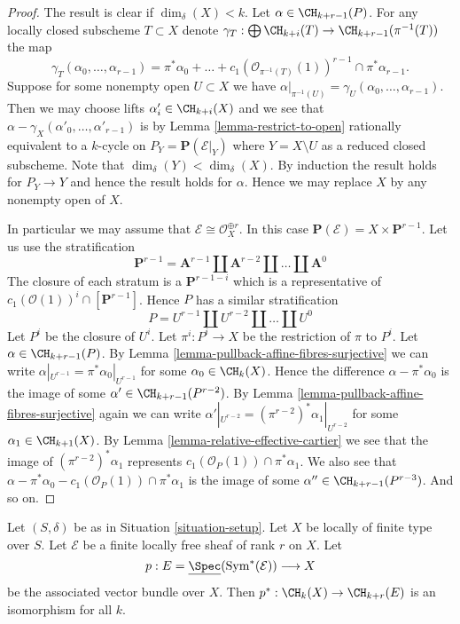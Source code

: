 \begin{proof}
\medskip\noindent
The result is clear if $\dim_\delta(X) < k$.
Let $\alpha \in \CH_{k + r - 1}(P)$.
For any locally closed subscheme $T \subset X$ denote
$\gamma_T : \bigoplus \CH_{k + i}(T) \to \CH_{k + r - 1}(\pi^{-1}(T))$
the map
$$
\gamma_T(\alpha_0, \ldots, \alpha_{r - 1})
= \pi^*\alpha_0 + \ldots +
c_1(\mathcal{O}_{\pi^{-1}(T)}(1))^{r - 1} \cap \pi^*\alpha_{r - 1}.
$$
Suppose for some nonempty open $U \subset X$ we have
$\alpha|_{\pi^{-1}(U)} = \gamma_U(\alpha_0, \ldots, \alpha_{r - 1})$.
Then we may choose lifts $\alpha'_i \in \CH_{k + i}(X)$ and we
see that $\alpha - \gamma_X(\alpha'_0, \ldots, \alpha'_{r - 1})$
is by Lemma \ref{lemma-restrict-to-open}
rationally equivalent to a $k$-cycle on $P_Y = \mathbf{P}(\mathcal{E}|_Y)$
where $Y = X \setminus U$ as a reduced closed subscheme.
Note that $\dim_\delta(Y) < \dim_\delta(X)$.
By induction the result holds
for $P_Y \to Y$ and hence the result holds for $\alpha$.
Hence we may replace $X$ by any nonempty open of $X$.

\medskip\noindent
In particular we may assume that $\mathcal{E} \cong \mathcal{O}_X^{\oplus r}$.
In this case $\mathbf{P}(\mathcal{E}) = X \times \mathbf{P}^{r - 1}$.
Let us use the stratification
$$
\mathbf{P}^{r - 1} = \mathbf{A}^{r - 1}
\amalg \mathbf{A}^{r - 2}
\amalg \ldots
\amalg \mathbf{A}^0
$$
The closure of each stratum is a $\mathbf{P}^{r - 1 - i}$ which is a
representative of $c_1(\mathcal{O}(1))^i \cap [\mathbf{P}^{r - 1}]$.
Hence $P$ has a similar stratification
$$
P = U^{r - 1} \amalg U^{r - 2} \amalg \ldots \amalg U^0
$$
Let $P^i$ be the closure of $U^i$. Let $\pi^i : P^i \to X$
be the restriction of $\pi$ to $P^i$.
Let $\alpha \in \CH_{k + r - 1}(P)$. By
Lemma \ref{lemma-pullback-affine-fibres-surjective}
we can write $\alpha|_{U^{r - 1}} = \pi^*\alpha_0|_{U^{r - 1}}$
for some $\alpha_0 \in \CH_k(X)$. Hence the difference
$\alpha - \pi^*\alpha_0$ is the image of some
$\alpha' \in \CH_{k + r - 1}(P^{r - 2})$.
By Lemma \ref{lemma-pullback-affine-fibres-surjective}
again we can write
$\alpha'|_{U^{r - 2}} = (\pi^{r - 2})^*\alpha_1|_{U^{r - 2}}$
for some $\alpha_1 \in \CH_{k + 1}(X)$.
By Lemma \ref{lemma-relative-effective-cartier}
we see that the image of $(\pi^{r - 2})^*\alpha_1$
represents $c_1(\mathcal{O}_P(1)) \cap \pi^*\alpha_1$.
We also see that
$\alpha - \pi^*\alpha_0 - c_1(\mathcal{O}_P(1)) \cap \pi^*\alpha_1$
is the image of some $\alpha'' \in \CH_{k + r - 1}(P^{r - 3})$.
And so on.
\end{proof}

\begin{lemma}
\label{lemma-vectorbundle}
Let $(S, \delta)$ be as in Situation \ref{situation-setup}.
Let $X$ be locally of finite type over $S$.
Let $\mathcal{E}$ be a finite locally free sheaf of rank $r$ on $X$.
Let
$$
p :
E = \underline{\Spec}(\text{Sym}^*(\mathcal{E}))
\longrightarrow
X
$$
be the associated vector bundle over $X$.
Then $p^* : \CH_k(X) \to \CH_{k + r}(E)$ is an isomorphism for all $k$.
\end{lemma}

